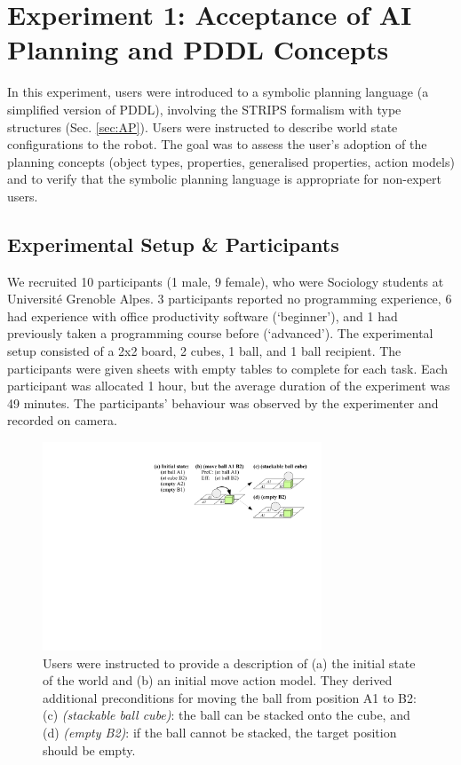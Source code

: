 
\section{Experiment 1: Acceptance of AI Planning and PDDL Concepts}\label{sec:Exp1}

In this experiment, users were introduced to a symbolic planning language (a simplified version of PDDL), involving the STRIPS formalism with type structures (Sec. \ref{sec:AP}). Users were instructed to describe world state configurations to the robot.
The goal was to assess the user's adoption of the planning concepts (object types, properties, generalised properties, action models) and to verify that the symbolic planning language is appropriate for non-expert users.
\subsection{Experimental Setup \& Participants}
We recruited 10 participants (1 male, 9 female), who were Sociology students at Universit\'{e} Grenoble Alpes. 3 participants reported no programming experience, 6  had experience with office productivity software (`beginner'), and 1 had previously taken a programming course before (`advanced').
%
The experimental setup consisted of a 2x2 board, 2 cubes, 1 ball, and 1 ball recipient.
The participants were given sheets with empty tables to complete for each task. 
Each participant was allocated 1 hour, but the average duration of the experiment was 49 minutes.
The participants' behaviour was observed by the experimenter and recorded on camera. 

 \begin{figure}[t]
  \centering
  \includegraphics[width=8.3cm]{figures/scenarios-exp1}
  \caption{Users were instructed to provide a description of (a) the initial state of the world and (b) an initial move action model. They derived additional preconditions for moving the ball from position A1 to B2: (c) \textit{(stackable ball cube)}: the ball can be stacked onto the cube, and (d) \textit{(empty B2)}: if the ball cannot be stacked, the target position should be empty.}
  \label{fig:scenarios-exp1}
 \end{figure}
 
